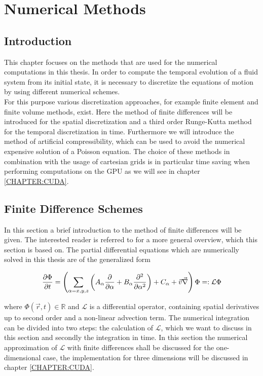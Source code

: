 \chapter{Numerical Methods}

\section{Introduction}

This chapter focuses on the methods that are used for the numerical computations in this thesis.
In order to compute the temporal evolution of a fluid system from its initial state, it is necessary to discretize
the equations of motion by using different numerical schemes.\\
For this purpose various discretization approaches, for example finite element and finite volume methods, exist.
Here the method of finite differences will be introduced for the spatial discretization and a third order Runge-Kutta method for the temporal discretization in time.
Furthermore we will introduce the method of artificial compressibility, which can be used to avoid the numerical expensive solution of a Poisson equation.
The choice of these methods in combination with the usage of cartesian grids is in particular time saving when performing computations on the GPU as we
will see in chapter \ref{CHAPTER:CUDA}.

\section{Finite Difference Schemes}

In this section a  brief introduction to the method of finite differences will be given.
The interested reader is referred to \citep{ferziger99} for a more general overview, which this section is based on.
The partial differential equations which are numerically solved in this thesis are of the generalized form

\begin{align}
    \label{numerik:pde_allg}
    \pdn[\Phi]{t} = \left(\sum_{\alpha=x,y,z}\left( A_\alpha \pdn[]{\alpha}  + B_\alpha \pdn[^2]{\alpha^2}\right) + C_\alpha +  \vec{v}\vec{\nabla} \right) \Phi =: \mathcal{L} \Phi
\end{align}

where $\Phi(\vec{r}, t)\in\mathbb{R}$ and $\mathcal{L}$ is a differential operator, containing spatial derivatives up to second order and a non-linear advection term.
The numerical integration can be divided into two steps: the calculation of $\mathcal{L}$, which we want to discuss in this
section and secondly the integration in time.
In this section the numerical approximation of $\mathcal{L}$ with finite differences shall be discussed for the one-dimensional case,
the implementation for three dimensions will be discussed in chapter \ref{CHAPTER:CUDA}.


